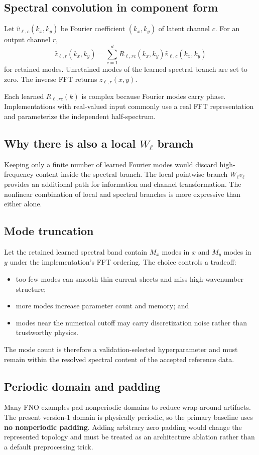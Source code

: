 \documentclass[11pt]{article}
\begin{document}
\subsection{Spectral convolution in component form}
Let $\widehat v_{\ell,c}(k_x,k_y)$ be Fourier coefficient $(k_x,k_y)$ of latent channel $c$. For an output channel $r$,
\[
\widehat z_{\ell,r}(k_x,k_y)
=
\sum_{c=1}^{d}
R_{\ell,rc}(k_x,k_y)\widehat v_{\ell,c}(k_x,k_y)
\]
for retained modes. Unretained modes of the learned spectral branch are set to zero. The inverse FFT returns $z_{\ell,r}(x,y)$.

Each learned $R_{\ell,rc}(k)$ is complex because Fourier modes carry phase. Implementations with real-valued input commonly use a real FFT representation and parameterize the independent half-spectrum.

\subsection{Why there is also a local $W_\ell$ branch}
Keeping only a finite number of learned Fourier modes would discard high-frequency content inside the spectral branch. The local pointwise branch $W_\ell v_\ell$ provides an additional path for information and channel transformation. The nonlinear combination of local and spectral branches is more expressive than either alone.

\subsection{Mode truncation}
Let the retained learned spectral band contain $M_x$ modes in $x$ and $M_y$ modes in $y$ under the implementation's FFT ordering. The choice controls a tradeoff:
\begin{itemize}
  \item too few modes can smooth thin current sheets and miss high-wavenumber structure;
  \item more modes increase parameter count and memory; and
  \item modes near the numerical cutoff may carry discretization noise rather than trustworthy physics.
\end{itemize}
The mode count is therefore a validation-selected hyperparameter and must remain within the resolved spectral content of the accepted reference data.

\subsection{Periodic domain and padding}
Many FNO examples pad nonperiodic domains to reduce wrap-around artifacts. The present version-1 domain is physically periodic, so the primary baseline uses \textbf{no nonperiodic padding}. Adding arbitrary zero padding would change the represented topology and must be treated as an architecture ablation rather than a default preprocessing trick.
\end{document}
